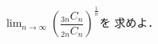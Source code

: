 \documentclass[../../main.tex]{subfiles}
\begin{document}
$\displaystyle\lim_{n\to\infty}{\left( \dfrac{_{3n}C_n}{_{2n}C_n} \right)}^{\frac{1}{n}}$を
求めよ．
\end{document}
